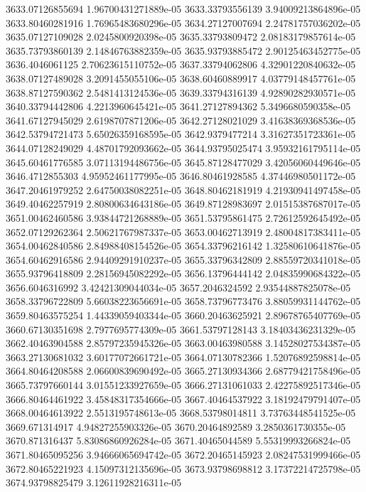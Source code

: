 {3633.07126855694 1.96700431271889e-05
3633.33793556139 3.94009213864896e-05
3633.80460281916 1.76965483680296e-05
3634.27127007694 2.24781757036202e-05
3635.07127109028 2.0245800920398e-05
3635.33793809472 2.08183179857614e-05
3635.73793860139 2.14846763882359e-05
3635.93793885472 2.90125463452775e-05
3636.4046061125 2.70623615110752e-05
3637.33794062806 4.32901220840632e-05
3638.07127489028 3.2091455055106e-05
3638.60460889917 4.03779148457761e-05
3638.87127590362 2.5481413124536e-05
3639.33794316139 4.92890282930571e-05
3640.33794442806 4.2213960645421e-05
3641.27127894362 5.3496680590358e-05
3641.67127945029 2.6198707871206e-05
3642.27128021029 3.41638369368536e-05
3642.53794721473 5.65026359168595e-05
3642.9379477214 3.31627351723361e-05
3644.07128249029 4.48701792093662e-05
3644.93795025474 3.95932161795114e-05
3645.60461776585 3.07113194486756e-05
3645.87128477029 3.42056060449646e-05
3646.4712855303 4.95952461177995e-05
3646.80461928585 4.37446980501172e-05
3647.20461979252 2.64750038082251e-05
3648.80462181919 4.21930941497458e-05
3649.40462257919 2.80800634643186e-05
3649.87128983697 2.01515387687017e-05
3651.00462460586 3.93844721268889e-05
3651.53795861475 2.72612592645492e-05
3652.07129262364 2.50621767987337e-05
3653.00462713919 2.48004817383411e-05
3654.00462840586 2.84988408154526e-05
3654.33796216142 1.32580610641876e-05
3654.60462916586 2.94409291910237e-05
3655.33796342809 2.88559720341018e-05
3655.93796418809 2.28156945082292e-05
3656.13796444142 2.04835990684322e-05
3656.6046316992 3.42421309044034e-05
3657.2046324592 2.93544887825078e-05
3658.33796722809 5.66038223656691e-05
3658.73796773476 3.88059931144762e-05
3659.80463575254 1.44339059403344e-05
3660.20463625921 2.89678765407769e-05
3660.67130351698 2.7977695774309e-05
3661.53797128143 3.18403436231329e-05
3662.40463904588 2.85797235945326e-05
3663.00463980588 3.14528027534387e-05
3663.27130681032 3.60177072661721e-05
3664.07130782366 1.52076892598814e-05
3664.80464208588 2.06600839690492e-05
3665.27130934366 2.68779421758496e-05
3665.73797660144 3.01551233927659e-05
3666.27131061033 2.42275892517346e-05
3666.80464461922 3.45848317354666e-05
3667.40464537922 3.18192479791407e-05
3668.00464613922 2.5513195748613e-05
3668.53798014811 3.73763448541525e-05
3669.671314917 4.94827255903326e-05
3670.20464892589 3.2850361730355e-05
3670.871316437 5.83086860926284e-05
3671.40465044589 5.55319993266824e-05
3671.80465095256 3.94666065694742e-05
3672.20465145923 2.08247531999466e-05
3672.80465221923 4.15097312135696e-05
3673.93798698812 3.17372214725798e-05
3674.93798825479 3.12611928216311e-05
}
